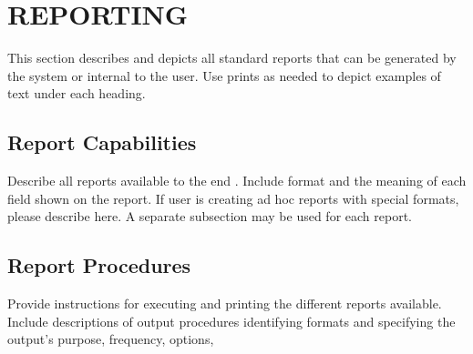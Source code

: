 \documentclass[10pt,letterpaper,extrafontsizes]{memoir}
\begin{document}
\chapter{REPORTING}

This section describes and depicts all standard reports that can be generated by the system or internal to the user.  Use  prints as needed to depict examples of text under each heading.
\section{Report Capabilities}

Describe all reports available to the end .  Include  format and the meaning of each field shown on the report.  If user is creating ad hoc reports with special formats, please describe here.  A separate subsection may be used for each report.
\section{Report Procedures}

Provide instructions for executing and printing the different reports available.  Include descriptions of output procedures identifying  formats and specifying the output's purpose, frequency, options,

\backmatter

\pagestyle{index}
\renewcommand{\preindexhook}{%
The first page number is usually, but not always, the primary reference to
the indexed topic.\vskip\onelineskip}
\indexintoc

\printindex

\onecolindex

\pagestyle{empty}
\null\vfil
\end{document}
